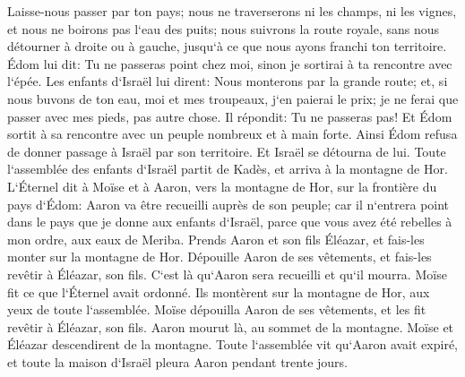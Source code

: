 \verse Laisse-nous passer par ton pays; nous ne traverserons ni les champs, ni les vignes, et nous ne boirons pas l`eau des puits; nous suivrons la route royale, sans nous détourner à droite ou à gauche, jusqu`à ce que nous ayons franchi ton territoire. 
\verse Édom lui dit: Tu ne passeras point chez moi, sinon je sortirai à ta rencontre avec l`épée. 
\verse Les enfants d`Israël lui dirent: Nous monterons par la grande route; et, si nous buvons de ton eau, moi et mes troupeaux, j`en paierai le prix; je ne ferai que passer avec mes pieds, pas autre chose. 
\verse Il répondit: Tu ne passeras pas! Et Édom sortit à sa rencontre avec un peuple nombreux et à main forte. 
\verse Ainsi Édom refusa de donner passage à Israël par son territoire. Et Israël se détourna de lui. 
\verse Toute l`assemblée des enfants d`Israël partit de Kadès, et arriva à la montagne de Hor. 
\verse L`Éternel dit à Moïse et à Aaron, vers la montagne de Hor, sur la frontière du pays d`Édom: 
\verse Aaron va être recueilli auprès de son peuple; car il n`entrera point dans le pays que je donne aux enfants d`Israël, parce que vous avez été rebelles à mon ordre, aux eaux de Meriba. 
\verse Prends Aaron et son fils Éléazar, et fais-les monter sur la montagne de Hor. 
\verse Dépouille Aaron de ses vêtements, et fais-les revêtir à Éléazar, son fils. C`est là qu`Aaron sera recueilli et qu`il mourra. 
\verse Moïse fit ce que l`Éternel avait ordonné. Ils montèrent sur la montagne de Hor, aux yeux de toute l`assemblée. 
\verse Moïse dépouilla Aaron de ses vêtements, et les fit revêtir à Éléazar, son fils. Aaron mourut là, au sommet de la montagne. Moïse et Éléazar descendirent de la montagne. 
\verse Toute l`assemblée vit qu`Aaron avait expiré, et toute la maison d`Israël pleura Aaron pendant trente jours. 

